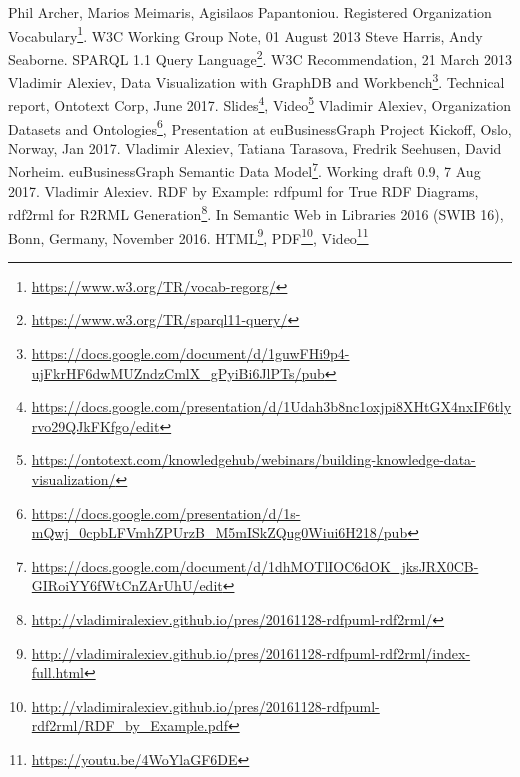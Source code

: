 \documentclass[runningheads,a4paper]{llncs}
\begin{document}
\begin{thebibliography}{4}
 Phil Archer, Marios Meimaris, Agisilaos Papantoniou. Registered Organization Vocabulary\footnote{\url{https://www.w3.org/TR/vocab-regorg/}}. W3C Working Group Note, 01 August 2013
 Steve Harris, Andy Seaborne. SPARQL 1.1 Query Language\footnote{\url{https://www.w3.org/TR/sparql11-query/}}. W3C Recommendation, 21 March 2013
 Vladimir Alexiev, Data Visualization with GraphDB and Workbench\footnote{\url{https://docs.google.com/document/d/1guwFHi9p4-ujFkrHF6dwMUZndzCmlX_gPyiBi6JlPTs/pub}}. Technical report, Ontotext Corp, June 2017. Slides\footnote{\url{https://docs.google.com/presentation/d/1Udah3b8nc1oxjpi8XHtGX4nxIF6tlyrvo29QJkFKfgo/edit}}, Video\footnote{\url{https://ontotext.com/knowledgehub/webinars/building-knowledge-data-visualization/}}
 Vladimir Alexiev, Organization Datasets and Ontologies\footnote{\url{https://docs.google.com/presentation/d/1s-mQwj_0cpbLFVmhZPUrzB_M5mISkZQug0Wiui6H218/pub}}, Presentation at euBusinessGraph Project Kickoff, Oslo, Norway, Jan 2017.
 Vladimir Alexiev, Tatiana Tarasova, Fredrik Seehusen, David Norheim. euBusinessGraph Semantic Data Model\footnote{\url{https://docs.google.com/document/d/1dhMOTlIOC6dOK_jksJRX0CB-GIRoiYY6fWtCnZArUhU/edit}}. Working draft 0.9, 7 Aug 2017. 
 Vladimir Alexiev. RDF by Example: rdfpuml for True RDF Diagrams, rdf2rml for R2RML Generation\footnote{\url{http://vladimiralexiev.github.io/pres/20161128-rdfpuml-rdf2rml/}}. In Semantic Web in Libraries 2016 (SWIB 16), Bonn, Germany, November 2016. HTML\footnote{\url{http://vladimiralexiev.github.io/pres/20161128-rdfpuml-rdf2rml/index-full.html}}, PDF\footnote{\url{http://vladimiralexiev.github.io/pres/20161128-rdfpuml-rdf2rml/RDF_by_Example.pdf}}, Video\footnote{\url{https://youtu.be/4WoYlaGF6DE}}

\end{thebibliography}
\end{document}
